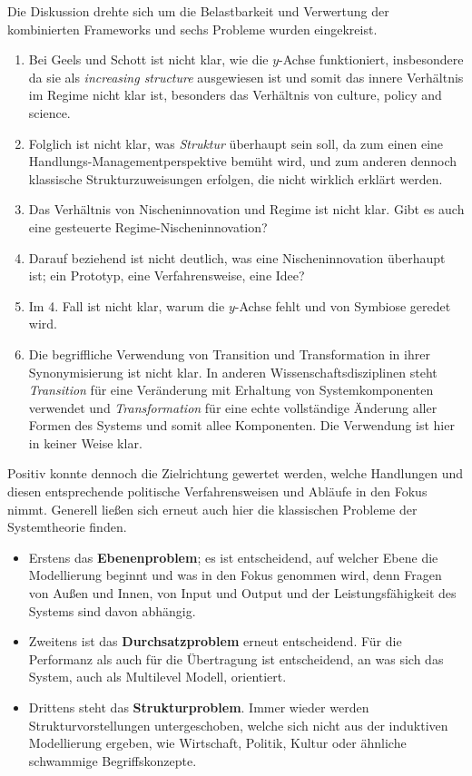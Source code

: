 \documentclass[11pt,a4paper]{article}
\begin{document}
Die Diskussion drehte sich um die Belastbarkeit und Verwertung der
kombinierten Frameworks und sechs Probleme wurden eingekreist.
\begin{enumerate}[noitemsep]
\item Bei Geels und Schott ist nicht klar, wie die $y$-Achse funktioniert,
  insbesondere da sie als \emph{increasing structure} ausgewiesen ist und
  somit das innere Verhältnis im Regime nicht klar ist, besonders das
  Verhältnis von culture, policy and science.
\item Folglich ist nicht klar, was \emph{Struktur} überhaupt sein soll, da zum
  einen eine Handlungs-Managementperspektive bemüht wird, und zum anderen
  dennoch klassische Strukturzuweisungen erfolgen, die nicht wirklich erklärt
  werden.
\item Das Verhältnis von Nischeninnovation und Regime ist nicht klar. Gibt es
  auch eine gesteuerte Regime-Nischeninnovation?
\item Darauf beziehend ist nicht deutlich, was eine Nischeninnovation
  überhaupt ist; ein Prototyp, eine Verfahrensweise, eine Idee?
\item Im 4. Fall ist nicht klar, warum die $y$-Achse fehlt und von Symbiose
  geredet wird.
\item Die begriff\-liche Verwendung von Transition und Transformation in ihrer
  Synonymisierung ist nicht klar. In anderen Wissenschaftsdisziplinen steht
  \emph{Transition} für eine Veränderung mit Erhaltung von Systemkomponenten
  verwendet und \emph{Transformation} für eine echte vollständige Änderung
  aller Formen des Systems und somit allee Komponenten. Die Verwendung ist
  hier in keiner Weise klar.
\end{enumerate}

Positiv konnte dennoch die Zielrichtung gewertet werden, welche Handlungen und
diesen entsprechende politische Verfahrensweisen und Abläufe in den Fokus
nimmt. Generell ließen sich erneut auch hier die klassischen Probleme der
Systemtheorie finden. 
\begin{itemize}[noitemsep]
\item Erstens das \textbf{Ebenenproblem}; es ist entscheidend, auf welcher
  Ebene die Modellierung beginnt und was in den Fokus genommen wird, denn
  Fragen von Außen und Innen, von Input und Output und der Leistungsfähigkeit
  des Systems sind davon abhängig.
\item Zweitens ist das \textbf{Durchsatzproblem} erneut entscheidend. Für die
  Performanz als auch für die Übertragung ist entscheidend, an was sich das
  System, auch als Multilevel Modell, orientiert.
\item Drittens steht das \textbf{Strukturproblem}. Immer wieder werden
  Strukturvorstellungen untergeschoben, welche sich nicht aus der induktiven
  Modellierung ergeben, wie Wirtschaft, Politik, Kultur oder ähnliche
  schwammige Begriffskonzepte.
\end{itemize}
\end{document}
